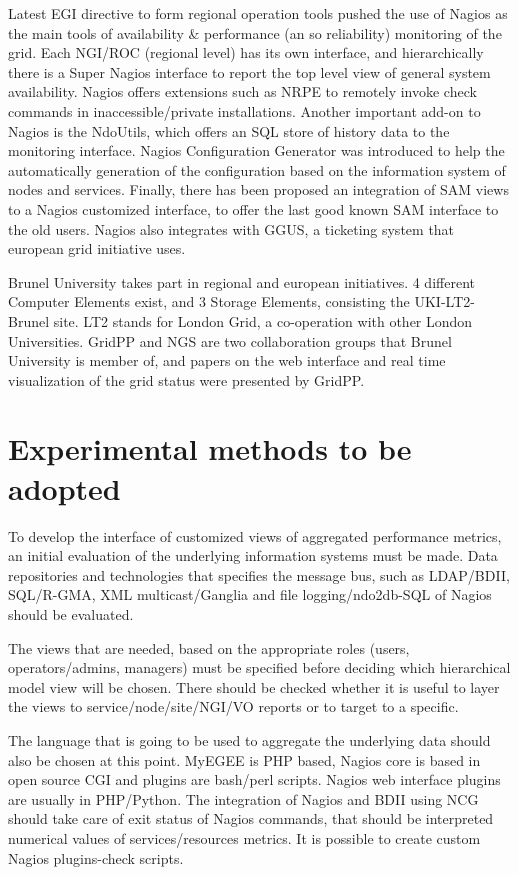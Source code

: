 Latest EGI directive to form regional operation tools pushed the use of Nagios \cite{imamagic2007grid} as the main tools of availability \& performance (an so reliability) monitoring of the grid. Each NGI/ROC (regional level) has its own interface, and hierarchically there is a Super Nagios interface to report the top level view of general system availability. Nagios offers extensions such as NRPE to remotely invoke check commands in inaccessible/private installations. Another important add-on to Nagios is the NdoUtils, which offers an SQL store of history data to the monitoring interface. Nagios Configuration Generator was introduced to help the automatically generation of the configuration based on the information system of nodes and services. Finally, there has been proposed an integration of SAM views to a Nagios customized interface, to offer the last good known SAM interface to the old users. Nagios also integrates with GGUS, a ticketing system that european grid initiative uses.

Brunel University takes part in regional and european initiatives. 4 different Computer Elements exist, and 3 Storage Elements, consisting the UKI-LT2-Brunel site. LT2 stands for London Grid, a co-operation with other London Universities. GridPP and NGS are two collaboration groups that Brunel University is member of, and papers on the web interface \cite{Hobson2007} and real time visualization of the grid status were presented \cite{Huang2007} by GridPP.

\section[Experimental]{Experimental methods to be adopted}

To develop the interface of customized views of aggregated performance metrics, an initial evaluation of the underlying information systems must be made. Data repositories and technologies that specifies the message bus, such as LDAP/BDII, SQL/R-GMA, XML multicast/Ganglia and file logging/ndo2db-SQL of Nagios should be evaluated. 

The views that are needed, based on the appropriate roles (users, operators/admins, managers) must be specified before deciding which hierarchical model view will be chosen. There should be checked whether it is useful to layer the views to service/node/site/NGI/VO reports or to target to a specific.

The language that is going to be used to aggregate the underlying data should also be chosen at this point. MyEGEE is PHP based, Nagios core is based in open source CGI and plugins are bash/perl scripts. Nagios web interface plugins are usually in PHP/Python. The integration of Nagios and BDII using NCG should take care of exit status of Nagios commands, that should be interpreted numerical values of services/resources metrics. It is possible to create custom Nagios plugins-check scripts. 

